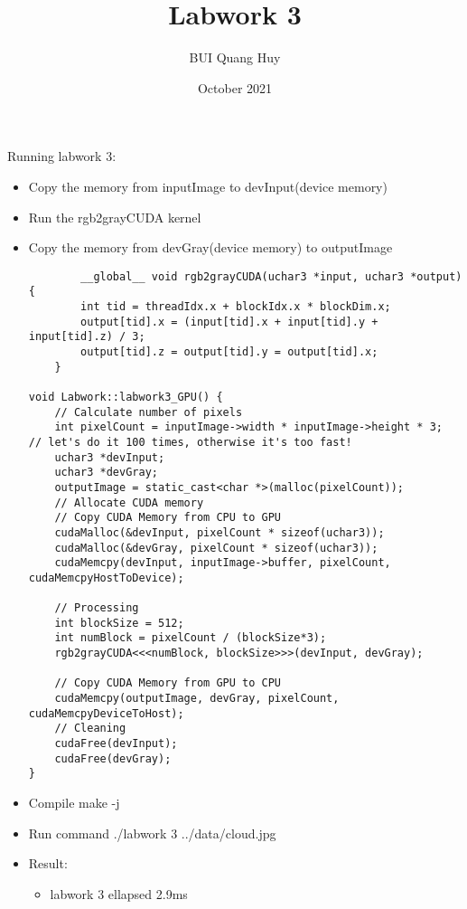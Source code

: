 \documentclass{article}
\title{Labwork 3}
\author{BUI Quang Huy}
\date{October 2021}
\begin{document}
\maketitle

Running labwork 3:
\begin{itemize}
    \item Copy the memory from inputImage to devInput(device memory)
    \item Run the rgb2grayCUDA kernel
    \item Copy the memory from devGray(device memory) to outputImage
    \begin{lstlisting}
        __global__ void rgb2grayCUDA(uchar3 *input, uchar3 *output) {
        int tid = threadIdx.x + blockIdx.x * blockDim.x;
        output[tid].x = (input[tid].x + input[tid].y + input[tid].z) / 3;
        output[tid].z = output[tid].y = output[tid].x;
    }

void Labwork::labwork3_GPU() {
    // Calculate number of pixels
    int pixelCount = inputImage->width * inputImage->height * 3;  // let's do it 100 times, otherwise it's too fast!
    uchar3 *devInput;
    uchar3 *devGray;
    outputImage = static_cast<char *>(malloc(pixelCount));
    // Allocate CUDA memory
    // Copy CUDA Memory from CPU to GPU
    cudaMalloc(&devInput, pixelCount * sizeof(uchar3));
    cudaMalloc(&devGray, pixelCount * sizeof(uchar3));
    cudaMemcpy(devInput, inputImage->buffer, pixelCount, cudaMemcpyHostToDevice);

    // Processing
    int blockSize = 512;
    int numBlock = pixelCount / (blockSize*3);
    rgb2grayCUDA<<<numBlock, blockSize>>>(devInput, devGray);
    
    // Copy CUDA Memory from GPU to CPU
    cudaMemcpy(outputImage, devGray, pixelCount, cudaMemcpyDeviceToHost);
    // Cleaning
    cudaFree(devInput);
    cudaFree(devGray);
}
    \end{lstlisting}
    \item Compile make -j
    \item Run command ./labwork 3 ../data/cloud.jpg
    \item Result:\begin{itemize}
        \item labwork 3 ellapsed 2.9ms
    \end{itemize}
\end{itemize}
\end{document}
